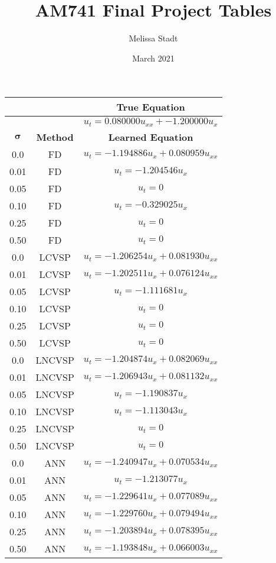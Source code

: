 \documentclass{article}
\title{AM741 Final Project Tables}
\author{Melissa Stadt}
\date{March 2021}
\begin{document}
\begin{tabular}{|c|c|c|}
    \hline
      &  & \textbf{True Equation} \\ 
    \hline
      &  & $u_t = 0.080000u_{xx} + -1.200000u_{x}$  \\  
    \hline
    $\mathbf{\sigma}$ & \textbf{Method} & \textbf{Learned Equation} \\ 
    \hline
    0.0  &   FD   &   $u_t = -1.194886u_{x} + 0.080959u_{xx}$ \\ 
    \hline
    0.01  &   FD   &   $u_t = -1.204546u_{x}$ \\ 
    \hline
    0.05  &   FD   &   $u_t = 0$ \\ 
    \hline
    0.10  &   FD   &   $u_t = -0.329025u_{x}$ \\ 
    \hline
    0.25  &   FD   &   $u_t = 0$ \\ 
    \hline
    0.50  &   FD   &   $u_t = 0$ \\ 
    \hline
    0.0  &   LCVSP   &   $u_t = -1.206254u_{x} + 0.081930u_{xx}$ \\ 
    \hline
    0.01  &   LCVSP   &   $u_t = -1.202511u_{x} + 0.076124u_{xx}$ \\ 
    \hline
    0.05  &   LCVSP   &   $u_t = -1.111681u_{x}$ \\ 
    \hline
    0.10  &   LCVSP   &   $u_t = 0$ \\ 
    \hline
    0.25  &   LCVSP   &   $u_t = 0$ \\ 
    \hline
    0.50  &   LCVSP   &   $u_t = 0$ \\ 
    \hline
    0.0  &   LNCVSP   &   $u_t = -1.204874u_{x} + 0.082069u_{xx}$ \\ 
    \hline
    0.01  &   LNCVSP   &   $u_t = -1.206943u_{x} + 0.081132u_{xx}$ \\ 
    \hline
    0.05  &   LNCVSP   &   $u_t = -1.190837u_{x}$ \\ 
    \hline
    0.10  &   LNCVSP   &   $u_t = -1.113043u_{x}$ \\ 
    \hline
    0.25  &   LNCVSP   &   $u_t = 0$ \\ 
    \hline
    0.50  &   LNCVSP   &   $u_t = 0$ \\ 
    \hline
    0.0  &   ANN   &   $u_t = -1.240947u_{x} + 0.070534u_{xx}$ \\ 
    \hline
    0.01  &   ANN   &   $u_t = -1.213077u_{x}$ \\ 
    \hline
    0.05  &   ANN   &   $u_t = -1.229641u_{x} + 0.077089u_{xx}$ \\ 
    \hline
    0.10  &   ANN   &   $u_t = -1.229760u_{x} + 0.079494u_{xx}$ \\ 
    \hline
    0.25  &   ANN   &   $u_t = -1.203894u_{x} + 0.078395u_{xx}$ \\ 
    \hline
    0.50  &   ANN   &   $u_t = -1.193848u_{x} + 0.066003u_{xx}$ \\ 
    \hline
\end{tabular}
\end{document}
